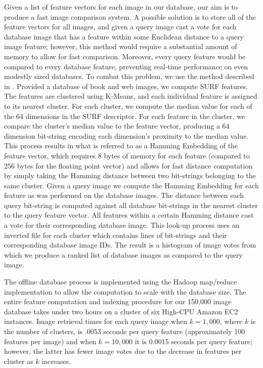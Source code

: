\documentclass{www2010-submission}
\begin{document}
Given a list of feature vectors for each image in our database, our
aim is to produce a fast image comparison system.  A possible solution
is to store all of the feature vectors for all images, and given a
query image cast a vote for each database image that has a feature
within some Euclidean distance to a query image feature; however, this
method would require a substantial amount of memory to allow
for fast comparison.  Moreover, every query feature would be compared
to every database feature, preventing real-time performance on even
modestly sized databases.  To combat this problem, we use the method
described in \cite{Schmid1478419}.  Provided a database of book and web
images, we compute SURF features. The features are clustered using
K-Means, and each individual feature is assigned to its nearest
cluster.  For each cluster, we compute the median value for each of
the 64 dimensions in the SURF descriptor.  For each feature in the
cluster, we compare the cluster's median value to the feature vector,
producing a 64 dimension bit-string encoding each dimension's
proximity to the median value.  This process results in what is
referred to as a Hamming Embedding of the feature vector, which
requires 8 bytes of memory for each feature (compared to 256 bytes for the floating point vector) and allows for fast
distance computation by simply taking the Hamming distance between two
bit-strings belonging to the same cluster.  Given a query image we
compute the Hamming Embedding for each feature as was performed on the
database images.  The distance between each query bit-string is
computed against all database bit-strings in the nearest cluster to
the query feature vector.  All features within a certain Hamming
distance cast a vote for their corresponding database image.  This
look-up process uses an inverted file for each cluster which contains
lines of bit-strings and their corresponding database image IDs.  The
result is a histogram of image votes from which we produce a ranked list of
database images as compared to the query image.

The offline database process is implemented using the Hadoop map/reduce \cite{Ghemaqat1327492} implementation to allow the computation to scale with the database size.  The entire feature computation and indexing procedure for our 150,000 image database takes under two hours on a cluster of six High-CPU Amazon EC2 instances.  Image retrieval times for each query image when $k=1,000$, where $k$ is the number of clusters, is .0053 seconds per query feature (approximately 100 features per image) and when $k=10,000$ it is 0.0015 seconds per query feature; however, the latter has fewer image votes due to the decrease in features per cluster as $k$ increases.
\end{document}
